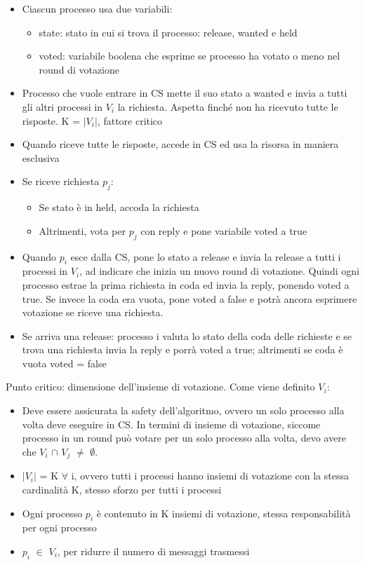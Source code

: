 \documentclass[16px]{article}
\begin{document}
\begin{itemize}
\item Ciascun processo usa due variabili:
\begin{itemize}
\item state: stato in cui si trova il processo: release, wanted e held
\item voted: variabile boolena che esprime se processo ha votato o  meno nel round di votazione
\end{itemize}
\item Processo che vuole entrare in CS mette il suo stato a wanted e invia a tutti gli altri processi in $V_i$ la richiesta. Aspetta finché non ha ricevuto tutte le risposte. K = $|V_i|$, fattore critico
\item Quando riceve tutte le risposte, accede in CS ed usa la risorsa in maniera esclusiva
\item Se riceve richiesta $p_j$:
\begin{itemize}
\item Se stato è in held, accoda la richiesta
\item Altrimenti, vota per $p_j$ con reply e pone variabile voted a true
\end{itemize}
\item Quando $p_i$ esce dalla CS, pone lo stato a release e invia la release a tutti i processi in $V_i$, ad indicare che inizia un nuovo round di votazione. Quindi ogni processo estrae la prima richiesta in coda ed invia la reply, ponendo voted a true. Se invece la coda era vuota, pone voted a false e potrà ancora esprimere votazione se riceve una richiesta.
\item Se arriva una release: processo i valuta lo stato della coda delle richieste e se trova una richiesta invia la reply e porrà voted a true; altrimenti se coda è vuota voted = false
\end{itemize}
Punto critico: dimensione dell'insieme di votazione. Come viene definito $V_i$:
\begin{itemize}
\item Deve essere assicurata la safety dell'algoritmo, ovvero un solo processo alla volta deve eseguire in CS. In termini di insieme di votazione, siccome processo in un round può votare per un solo processo alla volta, devo avere che $V_i$ $\cap$ $V_j$ $\neq$ $\emptyset$.
\item $|V_i|$ = K $\forall$ i, ovvero tutti i processi hanno insiemi di votazione con la stessa cardinalità K, stesso sforzo per tutti i processi
\item Ogni processo $p_i$ è contenuto in K insiemi di votazione, stessa responsabilità per ogni processo
\item $p_i$ $\in$ $V_i$, per ridurre il numero di messaggi trasmessi
\end{itemize}
\end{document}
